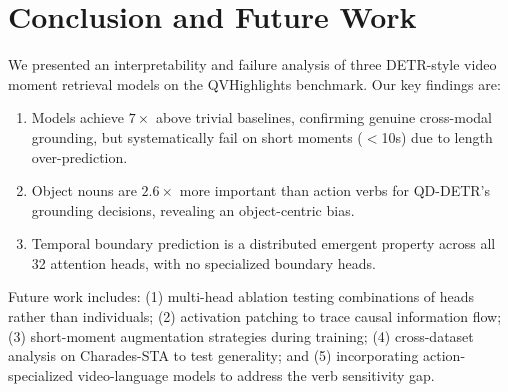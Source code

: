 \documentclass[10pt,twocolumn]{article}
\begin{document}
\section{Conclusion and Future Work}
\label{sec:conclusion}

We presented an interpretability and failure analysis of three DETR-style video moment retrieval models on the QVHighlights benchmark. Our key findings are:

\begin{enumerate}[nosep,leftmargin=*]
  \item Models achieve $7\times$ above trivial baselines, confirming genuine cross-modal grounding, but systematically fail on short moments ($<$10s) due to length over-prediction.
  \item Object nouns are $2.6\times$ more important than action verbs for QD-DETR's grounding decisions, revealing an object-centric bias.
  \item Temporal boundary prediction is a distributed emergent property across all 32 attention heads, with no specialized boundary heads.
\end{enumerate}

Future work includes: (1) multi-head ablation testing combinations of heads rather than individuals; (2) activation patching to trace causal information flow; (3) short-moment augmentation strategies during training; (4) cross-dataset analysis on Charades-STA to test generality; and (5) incorporating action-specialized video-language models to address the verb sensitivity gap.



\end{document}
